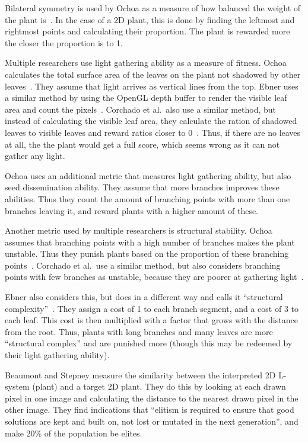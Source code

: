 Bilateral symmetry is used by Ochoa as a measure of how balanced the weight of the plant is~\cite{1998Ochoa}.
In the case of a 2D plant, this is done by finding the leftmost and rightmost points and calculating their proportion.
The plant is rewarded more the closer the proportion is to 1.

Multiple researchers use light gathering ability as a measure of fitness.
Ochoa calculates the total surface area of the leaves on the plant not shadowed by other leaves~\cite{1998Ochoa}.
They assume that light arrives as vertical lines from the top.
Ebner uses a similar method by using the OpenGL depth buffer to render the visible leaf area and count the pixels~\cite{2003Ebner}.
Corchado et al.\ also use a similar method, but instead of calculating the visible leaf area, they calculate the ration of shadowed leaves to visible leaves and reward ratios closer to 0~\cite{2009Corchado}.
Thus, if there are no leaves at all, the the plant would get a full score, which seems wrong as it can not gather any light.

Ochoa uses an additional metric that measures light gathering ability, but also seed dissemination ability.
They assume that more branches improves these abilities.
Thus they count the amount of branching points with more than one branches leaving it, and reward plants with a higher amount of these.~\cite{1998Ochoa}

Another metric used by multiple researchers is structural stability.
Ochoa assumes that branching points with a high number of branches makes the plant unstable.
Thus they punish plants based on the proportion of these branching points~\cite{1998Ochoa}.
Corchado et al.\ use a similar method, but also considers branching points with few branches as unstable, because they are poorer at gathering light~\cite{2009Corchado}.

Ebner also considers this, but does in a different way and calls it ``structural complexity''~\cite{2003Ebner}.
They assign a cost of 1 to each branch segment, and a cost of 3 to each leaf.
This cost is then multiplied with a factor that grows with the distance from the root.
Thus, plants with long branches and many leaves are more ``structural complex'' and are punished more (though this may be redeemed by their light gathering ability).

Beaumont and Stepney measure the similarity between the interpreted 2D \gls{L-system} (plant) and a target 2D plant.
They do this by looking at each drawn pixel in one image and calculating the distance to the nearest drawn pixel in the other image.
They find indications that ``elitism is required to ensure that good solutions are kept and built on, not lost or mutated in the next generation'', and make 20\% of the population be elites.~\cite{2009Beaumont}

